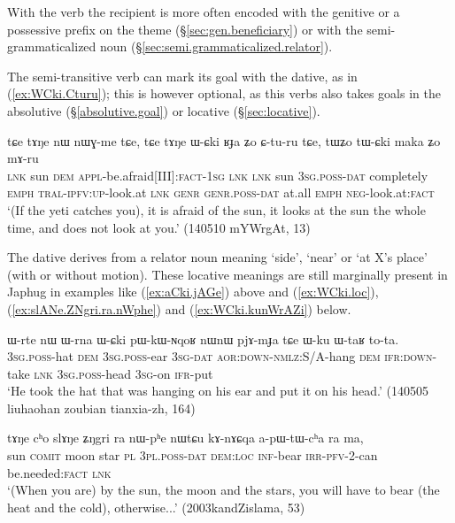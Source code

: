 With the verb  the recipient is more often encoded with the genitive or a possessive prefix on the theme (§\ref{sec:gen.beneficiary}) or with the semi-grammati\-ca\-lized noun  (§\ref{sec:semi.grammaticalized.relator}).

 
The semi-transitive verb  can mark its goal with the dative, as in (\ref{ex:WCki.Cturu}); this is however optional, as this verbs also takes goals in the absolutive (§\ref{absolutive.goal}) or locative (§\ref{sec:locative}).

\begin{exe}
\ex \label{ex:WCki.Cturu}
\gll tɕe tɤŋe nɯ nɯɣ-me tɕe, tɕe tɤŋe ɯ-ɕki ʁɟa ʑo ɕ-tu-ru tɕe, tɯʑo tɯ-ɕki maka ʑo mɤ-ru \\
\textsc{lnk} sun \textsc{dem} \textsc{appl}-be.afraid[III]:\textsc{fact}-\textsc{1sg} \textsc{lnk} \textsc{lnk} sun \textsc{3sg}.\textsc{poss}-\textsc{dat} completely \textsc{emph} \textsc{tral}-\textsc{ipfv}:\textsc{up}-look.at \textsc{lnk} \textsc{genr} \textsc{genr}.\textsc{poss}-\textsc{dat} at.all \textsc{emph} \textsc{neg}-look.at:\textsc{fact} \\
\glt `(If the yeti catches you), it is afraid of the sun, it looks at the sun the whole time, and does not look at you.' (140510 mYWrgAt, 13)
\end{exe}

The dative  derives from a relator noun meaning `side', `near' or `at X's place' (with or without motion). These locative meanings are still marginally present in Japhug in examples like (\ref{ex:aCki.jAGe}) above and (\ref{ex:WCki.loc}), (\ref{ex:slANe.ZNgri.ra.nWphe}) and (\ref{ex:WCki.kunWrAZi}) below.

\begin{exe}
\ex \label{ex:WCki.loc}
\gll  ɯ-rte nɯ ɯ-rna ɯ-ɕki pɯ-kɯ-ɴqoʁ nɯnɯ pjɤ-mɟa tɕe ɯ-ku ɯ-taʁ to-ta. \\
\textsc{3sg}.\textsc{poss}-hat \textsc{dem} \textsc{3sg}.\textsc{poss}-ear \textsc{3sg}-\textsc{dat} \textsc{aor}:\textsc{down}-\textsc{nmlz}:S/A-hang \textsc{dem} \textsc{ifr}:\textsc{down}-take \textsc{lnk} \textsc{3sg}.\textsc{poss}-head \textsc{3sg}-on \textsc{ifr}-put \\
\glt `He took the hat that was hanging on his ear and put it on his head.' (140505 liuhaohan zoubian tianxia-zh, 164)
\end{exe}

\begin{exe}
\ex \label{ex:slANe.ZNgri.ra.nWphe}
\gll   tɤŋe cʰo slɤŋe ʑŋgri ra nɯ-pʰe nɯtɕu kɤ-nɤɕqa a-pɯ-tɯ-cʰa ra ma, \\
sun \textsc{comit} moon star \textsc{pl} \textsc{3pl}.\textsc{poss}-\textsc{dat} \textsc{dem}:\textsc{loc} \textsc{inf}-bear \textsc{irr}-\textsc{pfv}-2-can be.needed:\textsc{fact} \textsc{lnk} \\
\glt `(When you are) by the sun, the moon and the stars, you will have to bear (the heat and the cold), otherwise...' (2003kandZislama, 53)
\end{exe}
 
